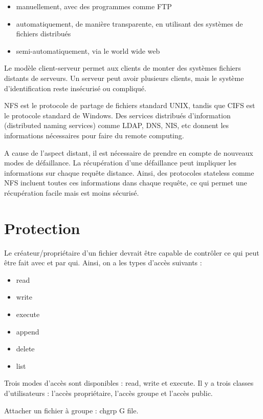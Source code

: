 	\begin{itemize}
		\item manuellement, avec des programmes comme FTP
		\item automatiquement, de manière transparente, en utilisant des systèmes de fichiers distribués
		\item semi-automatiquement, via le world wide web
	\end{itemize}
	
	Le modèle client-serveur permet aux clients de monter des systèmes fichiers distants de serveurs. Un serveur peut avoir plusieurs clients, mais le système d'identification reste insécurisé ou compliqué.
	
	NFS est le protocole de partage de fichiers standard UNIX, tandis que CIFS est le protocole standard de Windows. Des services distribués d'information (distributed naming services) comme LDAP, DNS, NIS, etc donnent les informations nécessaires pour faire du remote computing.
	
	A cause de l'aspect distant, il est nécessaire de prendre en compte de nouveaux modes de défaillance.  La récupération d'une défaillance peut impliquer les informations sur chaque requête distance. Ainsi, des protocoles stateless comme NFS incluent toutes ces informations dans chaque requête, ce qui permet une récupération facile mais est moins sécurisé.
	
	
\section{Protection}
	
Le créateur/propriétaire d'un fichier devrait être capable de contrôler ce qui peut être fait avec et par qui. Ainsi, on a les types d'accès suivants :
	
	\begin{itemize}
		\item read
		\item write
		\item execute
		\item append
		\item delete
		\item list
	\end{itemize}
	
	Trois modes d'accès sont disponibles : read, write et execute. Il y a trois classes d'utilisateurs : l'accès propriétaire, l'accès groupe et l'accès public.
	
	Attacher un fichier à groupe : chgrp G file.